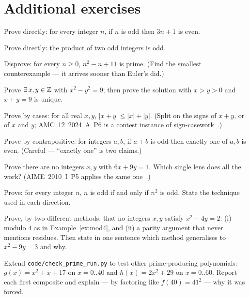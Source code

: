 \section{Additional exercises}
\begin{exercise}[easy]
Prove directly: for every integer $n$, if $n$ is odd then $3n + 1$ is even.
\end{exercise}
\begin{exercise}[easy]
Prove directly: the product of two odd integers is odd.
\end{exercise}
\begin{exercise}[easy]
Disprove: for every $n \ge 0$, $n^2 - n + 11$ is prime. (Find the smallest
counterexample --- it arrives sooner than Euler's did.)
\end{exercise}
\begin{exercise}[easy]
Prove $\exists\, x, y \in \mathbb{Z}$ with $x^2 - y^2 = 9$; then prove the solution with
$x > y > 0$ and $x + y = 9$ is unique.
\end{exercise}
\begin{exercise}[medium]
Prove by cases: for all real $x, y$, $|x + y| \le |x| + |y|$.
(Split on the signs of $x + y$, or of $x$ and $y$; AMC~12~2024~A~P6 is a
contest instance of sign-casework~\cite{aops-amc}.)
\end{exercise}
\begin{exercise}[medium]
Prove by contrapositive: for integers $a, b$, if $a + b$ is odd then exactly one
of $a, b$ is even. (Careful --- ``exactly one'' is two claims.)
\end{exercise}
\begin{exercise}[medium]
Prove there are no integers $x, y$ with $6x + 9y = 1$. Which single lens does
all the work? (AIME~2010~I~P5 applies the same one~\cite{aops-amc}.)
\end{exercise}
\begin{exercise}[medium]
Prove: for every integer $n$, $n$ is odd if and only if $n^2$ is odd.
State the technique used in each direction.
\end{exercise}
\begin{exercise}[hard]
Prove, by two different methods, that no integers $x, y$ satisfy
$x^2 - 4y = 2$: (i) modulo $4$ as in Example~\ref{ex:mod4}, and (ii) a parity
argument that never mentions residues. Then state in one sentence which method
generalises to $x^2 - 9y = 3$ and why.
\end{exercise}
\begin{exercise}[hard]
Extend \texttt{code/check\_prime\_run.py} to test other prime-producing
polynomials: $g(x) = x^2 + x + 17$ on $x = 0..40$ and $h(x) = 2x^2 + 29$ on
$x = 0..60$. Report each first composite and explain --- by factoring like
$f(40) = 41^2$ --- why it was forced.
\end{exercise}
